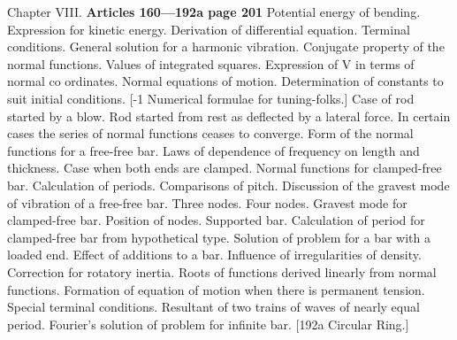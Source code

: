 Chapter VIII. \textbf{Articles 160—192a page 201}
Potential energy of bending. Expression for kinetic energy. Derivation of
differential equation. Terminal conditions. General solution for a harmonic
vibration. Conjugate property of the normal functions.  Values of integrated
squares. Expression of V in terms of normal co ordinates. Normal equations of
motion. Determination of constants to suit initial conditions.
[-1 Numerical formulae for tuning-folks.]
Case of rod
started by a blow. Rod started from rest as deflected by a lateral force. In
certain cases the series of normal functions ceases to converge. Form of the
normal functions for a free-free bar. Laws of dependence of frequency on length
and thickness. Case when both ends are clamped. Normal functions for
clamped-free bar. Calculation of periods. Comparisons of pitch. Discussion of the
gravest mode of vibration of a free-free bar. Three nodes. Four nodes.  Gravest
mode for clamped-free bar. Position of nodes. Supported bar.  Calculation of
period for clamped-free bar from hypothetical type. Solution of problem for a bar
with a loaded end.  Effect of additions to a bar. Influence of irregularities of
density.  Correction for rotatory inertia. Roots of functions derived linearly
from normal functions. Formation of equation of motion when there is permanent
tension. Special terminal conditions. Resultant of two trains of waves of
nearly equal period. Fourier’s solution of problem for infinite bar.
[192a Circular Ring.]

